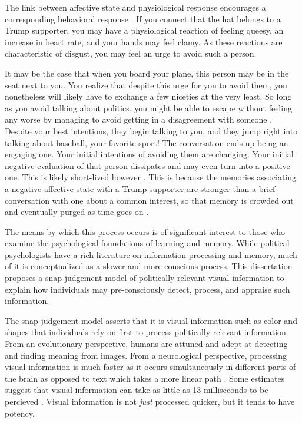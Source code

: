 \documentclass [12pt]{article}
\begin{document}
The link between affective state and physiological response encourages a corresponding behavioral response \citep{valentino_et-al_2011_jop}. If you connect that the hat belongs to a Trump supporter, you may have a physiological reaction of feeling queesy, an increase in heart rate, and your hands may feel clamy. As these reactions are characteristic of disgust, you may feel an urge to avoid such a person. 

It may be the case that when you board your plane, this person may be in the seat next to you. You realize that despite this urge for you to avoid them, you nonetheless will likely have to exchange a few niceties at the very least. So long as you avoid talking about politics, you might be able to escape without feeling any worse by managing to avoid getting in a disagreement with someone \citep{mutz_2006, carlson_settle_2022_cup}. Despite your best intentions, they begin talking to you, and they jump right into talking about baseball, your favorite sport! The conversation ends up being an engaging one. Your initial intentions of avoiding them are changing. Your initial negative evaluation of that person dissipates and may even turn into a positive one. This is likely short-lived however \citep{santoro_broockman_2022_sa}. This is because the memories associating a negative affective state with a Trump supporter are stronger than a brief conversation with one about a common interest, so that memory is crowded out and eventually purged as time goes on \citep{kahana_et-al_2022_ohhum}.

The means by which this process occurs is of significant interest to those who examine the psychological foundations of learning and memory. While political psychologists have a rich literature on information processing and memory, much of it is conceptualized as a slower and more conscious process. This dissertation proposes a snap-judgement model of politically-relevant visual information to explain how individuals may pre-consciously detect, process, and appraise such information. 

The snap-judgement model asserts that it is visual information such as color and shapes that individuals rely on first to process politically-relevant information. From an evolutionary perspective, humans are attuned and adept at detecting and finding meaning from images. From a neurological perspective, processing visual information is much faster as it occurs simultaneously in different parts of the brain as opposed to text which takes a more linear path \citep{vogel_et-al_1986_wp}. Some estimates suggest that visual information can take as little as 13 milliseconds to be percieved \citep{potter_et-al_2014_app}. Visual information is not \textit{just} processed quicker, but it tends to have potency.
\end{document}
